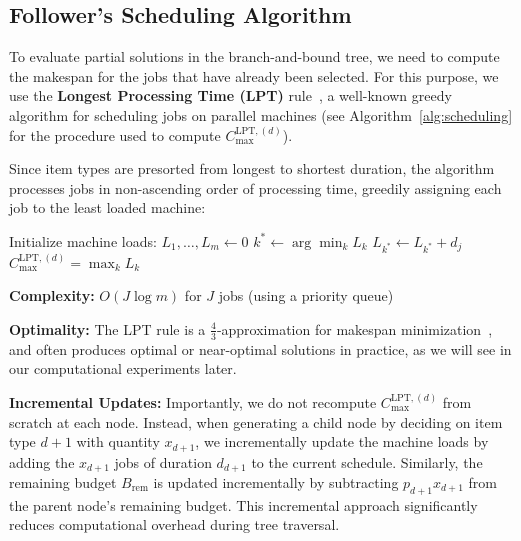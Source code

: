 \subsection{Follower's Scheduling Algorithm}


To evaluate partial solutions in the branch-and-bound tree, we need to compute the makespan for the jobs that have already been selected. For this purpose, we use the \textbf{Longest Processing Time (LPT)} rule~\cite{graham1969bounds}, a well-known greedy algorithm for scheduling jobs on parallel machines (see Algorithm~\ref{alg:scheduling} for the procedure used to compute $C_{\max}^{\text{LPT},(d)}$).

Since item types are presorted from longest to shortest duration, the algorithm processes jobs in non-ascending order of processing time, greedily assigning each job to the least loaded machine:

\begin{algorithm}
\caption{LPT Scheduling for $C_{\max}^{\text{LPT},(d)}$ Computation}
\label{alg:scheduling}
\begin{algorithmic}[1]
\State Initialize machine loads: $L_1, \ldots, L_m \gets 0$
    \State $k^* \gets \arg\min_{k} L_k$ 
    \State $L_{k^*} \gets L_{k^*} + d_j$ 
\EndFor
\State \Return $C_{\max}^{\text{LPT},(d)} = \max_k L_k$
\end{algorithmic}
\end{algorithm}

\textbf{Complexity:} $O(J \log m)$ for $J$ jobs (using a priority queue)

\textbf{Optimality:} The LPT rule is a $\frac{4}{3}$-approximation for makespan minimization~\cite{graham1969bounds}, and often produces optimal or near-optimal solutions in practice, as we will see in our computational experiments later.

\textbf{Incremental Updates:} Importantly, we do not recompute $C_{\max}^{\text{LPT},(d)}$ from scratch at each node. 
Instead, when generating a child node by deciding on item type $d+1$ with quantity $x_{d+1}$, 
we incrementally update the machine loads by adding the $x_{d+1}$ jobs of duration $d_{d+1}$ to the current schedule. 
Similarly, the remaining budget $B_{\text{rem}}$ is updated incrementally by subtracting $p_{d+1} x_{d+1}$ from the parent node's remaining budget. 
This incremental approach significantly reduces computational overhead during tree traversal.



